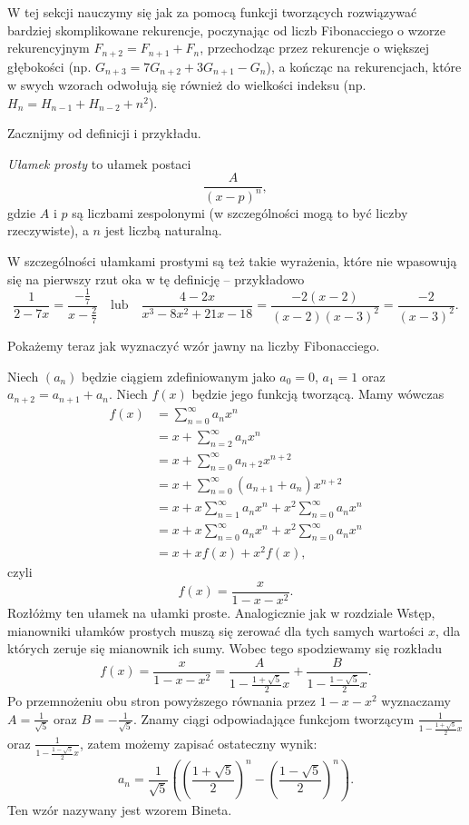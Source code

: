 \documentclass[shortabstract]{imthesis}
\begin{document}
    W tej sekcji nauczymy się jak za pomocą funkcji tworzących rozwiązywać bardziej skomplikowane rekurencje, poczynając od liczb Fibonacciego o wzorze rekurencyjnym $F_{n+2} = F_{n+1} + F_n$, przechodząc przez rekurencje o większej głębokości (np. $G_{n+3} = 7G_{n+2} + 3G_{n+1} - G_n$), a kończąc na rekurencjach, które w swych wzorach odwołują się również do wielkości indeksu (np. $H_n = H_{n-1} + H_{n-2} + n^2$).

    Zacznijmy od definicji i przykładu.

    \begin{definition}
    \emph{Ułamek prosty} to ułamek postaci
    $$
    \frac{A}{(x-p)^n},
    $$
    gdzie $A$ i $p$ są liczbami zespolonymi (w szczególności mogą to być liczby rzeczywiste), a $n$ jest liczbą naturalną.
    \end{definition}

    W szczególności ułamkami prostymi są też takie wyrażenia, które nie wpasowują się na pierwszy rzut oka w tę definicję -- przykładowo
    $$
    \frac{1}{2-7x} = \frac{-\frac17}{x-\frac27}
    \quad\text{lub}\quad
    \frac{4-2x}{x^3-8x^2+21x-18} = \frac{-2(x-2)}{(x-2)(x-3)^2} = \frac{-2}{(x-3)^2}.
    $$

    Pokażemy teraz jak wyznaczyć wzór jawny na liczby Fibonacciego.

    \begin{example}
    Niech $(a_n)$ będzie ciągiem zdefiniowanym jako $a_0 = 0$, $a_1 = 1$ oraz $a_{n+2} = a_{n+1} + a_n$. Niech $f(x)$ będzie jego funkcją tworzącą. Mamy wówczas
    \begin{align*}
        f(x) &= \sum_{n=0}^\infty a_nx^n \\
        &= x + \sum_{n=2}^\infty a_nx^n \\
        &= x + \sum_{n=0}^\infty a_{n+2}x^{n+2} \\
        &= x + \sum_{n=0}^\infty (a_{n+1} + a_n)x^{n+2} \\
        &= x + x\sum_{n=1}^\infty a_nx^n + x^2\sum_{n=0}^\infty a_nx^n \\
        &= x + x\sum_{n=0}^\infty a_nx^n + x^2\sum_{n=0}^\infty a_nx^n \\
        &= x + x f(x) + x^2 f(x),
    \end{align*}
    czyli
    $$
    f(x) = \frac{x}{1-x-x^2}.
    $$
    Rozłóżmy ten ułamek na ułamki proste. Analogicznie jak w rozdziale Wstęp, mianowniki ułamków prostych muszą się zerować dla tych samych wartości $x$, dla których zeruje się mianownik ich sumy. Wobec tego spodziewamy się rozkładu
    $$
    f(x) = \frac{x}{1-x-x^2} = \frac{A}{1-\frac{1+\sqrt{5}}{2}x} + \frac{B}{1-\frac{1-\sqrt{5}}{2}x}.
    $$
    Po przemnożeniu obu stron powyższego równania przez $1-x-x^2$ wyznaczamy $A = \frac{1}{\sqrt{5}}$ oraz $B = -\frac{1}{\sqrt{5}}$. Znamy ciągi odpowiadające funkcjom tworzącym $\frac{1}{1-\frac{1+\sqrt{5}}{2}x}$ oraz $\frac{1}{1-\frac{1-\sqrt{5}}{2}x}$, zatem możemy zapisać ostateczny wynik:
    $$
    a_n = \frac{1}{\sqrt{5}} \left(\left(\frac{1+\sqrt{5}}{2}\right)^n - \left(\frac{1-\sqrt{5}}{2}\right)^n\right).
    $$
    Ten wzór nazywany jest wzorem Bineta.
    \end{example}
\end{document}
